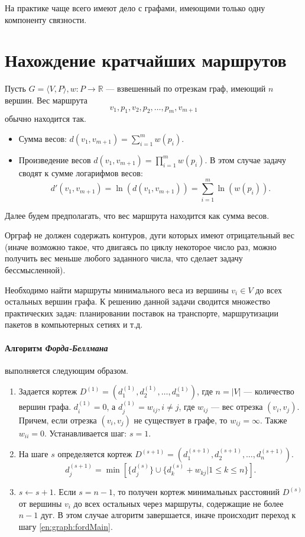 На практике чаще всего имеют дело с графами, имеющими только одну компоненту связности.


\section{Нахождение кратчайших маршрутов}

Пусть $G=\langle V,P\rangle,w:P\to\mathbb{R}$ --- взвешенный по отрезкам граф, имеющий $n$ вершин. Вес маршрута 
\[
    v_1,p_1,v_2,p_2,\ldots,p_{m},v_{m+1}
\]    
обычно находится так.
\begin{itemize}
    \item Сумма весов: $\displaystyle d(v_1,v_{m+1})=\sum_{i=1}^{m}w(p_i)$.
    
    \item Произведение весов $\displaystyle d(v_1,v_{m+1})=\prod_{i=1}^{m}w(p_i)$.
    В этом случае задачу сводят к сумме логарифмов весов:
    \[
        d'(v_1,v_{m+1})=\ln(d(v_1,v_{m+1}))=\sum_{i=1}^{m}\ln(w(p_i)).
    \]
\end{itemize}

Далее будем предполагать, что вес маршрута находится как сумма весов.

Орграф не должен содержать контуров, дуги которых имеют отрицательный вес (иначе возможно такое, что двигаясь по циклу некоторое число раз, можно получить вес меньше любого заданного числа, что сделает задачу бессмысленной).

Необходимо найти маршруты минимального веса из вершины $v_i\in V$ до всех остальных вершин графа. К решению данной задачи сводится множество практических задач: планировании поставок на транспорте, маршрутизации пакетов в компьютерных сетиях и т.д.

\paragraph{Алгоритм \emph{Форда-Беллмана}} выполняется следующим образом.
\begin{enumerate}
    \item Задается кортеж $D^{(1)}=(d_1^{(1)},d_2^{(1)},\ldots,d_n^{(1)})$, где $n=|V|$ --- количество вершин графа. $d_i^{(1)}=0$, а $d_j^{(1)}=w_{ij}, i\neq j$, где $w_{ij}$ --- вес отрезка $(v_i,v_j)$. Причем, если отрезка $(v_i,v_j)$ не существует в графе, то $w_{ij}=\infty$. Также $w_{ii}=0$. Устанавливается шаг: $s=1$.
    
    \item\label{en:graph:fordMain} На шаге $s$ определяется кортеж $D^{(s+1)}=(d_1^{(s+1)},d_2^{(s+1)},\ldots,d_n^{(s+1)})$. 
    \[
        d_j^{(s+1)}=\min[\{d_j^{(s)}\}\cup\{d_k^{(s)}+w_{kj}|1\leq k\leq n\}].
    \]
    
    \item $s\gets s+1$. Если $s=n-1$, то получен кортеж минимальных расстояний $D^{(s)}$ от вершины $v_i$ до всех остальных через маршруты, содержащие не более $n-1$ дуг. В этом случае алгоритм завершается, иначе происходит переход к шагу \ref{en:graph:fordMain}.
\end{enumerate}

